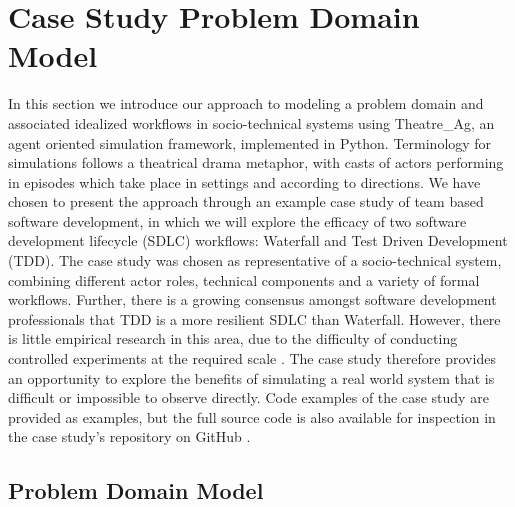 \documentclass{llncs}
\begin{document}

\section{Case Study Problem Domain Model}
\label{sec:case-study}


In this section we introduce our approach to modeling a problem domain and associated idealized workflows in
socio-technical systems using Theatre\_Ag, an agent oriented simulation framework, implemented in Python.  Terminology for
simulations follows a theatrical drama metaphor, with casts of actors performing in episodes which take place in
settings and according to directions. We have chosen to present the approach through an example case study of team based
software development, in which we will explore the efficacy of two software development lifecycle (SDLC) workflows:
Waterfall and Test Driven Development (TDD).  The case study was chosen as representative of a socio-technical system,
combining different actor roles, technical components and a variety of formal workflows.  Further, there is a growing
consensus amongst software development professionals that TDD is a more resilient SDLC than Waterfall. However, there is
little empirical research in this area, due to the difficulty of conducting controlled experiments at the required scale
\cite{George2004TestDrivenDevelopment}. The case study therefore provides an opportunity to explore the benefits of
simulating a real world system that is difficult or impossible to observe directly. Code examples of the case study are
provided as examples, but the full source code is also available for inspection in the case study's repository on GitHub
\cite{storer2016softdev-workflow-scm}.


\subsection{Problem Domain Model}

\end{document}
